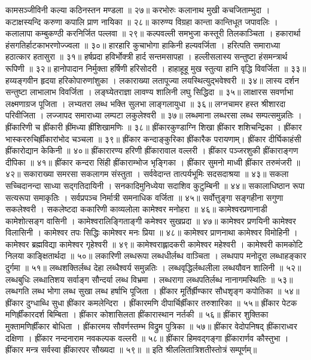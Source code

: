 कामसञ्जीविनी कल्या कठिनस्तन मण्डला ॥ २७॥
करभोरुः कलानाथ मुखी कचजिताम्भुदा ।
कटाक्षस्यन्दि करुणा कपालि प्राण नायिका ॥ २८॥
कारुण्य विग्रहा कान्ता कान्तिधूत जपावलिः ।
कलालापा कम्बुकण्ठी करनिर्जित पल्लवा ॥ २९॥
कल्पवल्ली समभुजा कस्तूरी तिलकाञ्चिता ।
हकारार्था हंसगतिर्हाटकाभरणोज्ज्वला ॥ ३०॥
हारहारि कुचाभोगा हाकिनी हल्यवर्जिता ।
हरित्पति समाराध्या हठात्कार हतासुरा ॥ ३१॥
हर्षप्रदा हविर्भोक्त्री हार्द सन्तमसापहा ।
हल्लीसलास्य सन्तुष्टा हंसमन्त्रार्थ रूपिणी ॥ ३२॥
हानोपादान निर्मुक्ता हर्षिणी हरिसोदरी ।
हाहाहूहू मुख स्तुत्या हानि वृद्धि विवर्जिता ॥ ३३॥
हय्यङ्गवीन हृदया हरिकोपारुणांशुका ।
लकाराख्या लतापूज्या लयस्थित्युद्भवेश्वरी ॥ ३४॥
लास्य दर्शन सन्तुष्टा लाभालाभ विवर्जिता ।
लङ्घ्येतराज्ञा लावण्य शालिनी लघु सिद्धिदा ॥ ३५॥
लाक्षारस सवर्णाभा लक्ष्मणाग्रज पूजिता ।
लभ्यतरा लब्ध भक्ति सुलभा लाङ्गलायुधा ॥ ३६॥
लग्नचामर हस्त श्रीशारदा परिवीजिता ।
लज्जापद समाराध्या लम्पटा लकुलेश्वरी ॥ ३७॥
लब्धमाना लब्धरसा लब्ध सम्पत्समुन्नतिः ।
ह्रींकारिणी च ह्रींकारी ह्रींमध्या ह्रींशिखामणिः ॥ ३८॥
ह्रींकारकुण्डाग्नि शिखा ह्रींकार शशिचन्द्रिका ।
ह्रींकार भास्कररुचिर्ह्रींकारांभोद चञ्चला ॥ ३९॥
ह्रींकार कन्दाङ्कुरिका ह्रींकारैक परायणाम्।
ह्रींकार दीर्घिकाहंसी ह्रींकारोद्यान केकिनी ॥ ४०॥
ह्रींकारारण्य हरिणी ह्रींकारावाल वल्लरी ।
ह्रींकार पञ्जरशुकी ह्रींकाराङ्गण दीपिका ॥ ४१॥
ह्रींकार कन्दरा सिंही ह्रींकाराम्भोज भृङ्गिका ।
ह्रींकार सुमनो माध्वी ह्रींकार तरुमंजरी ॥ ४२॥
सकाराख्या समरसा सकलागम संस्तुता ।
सर्ववेदान्त तात्पर्यभूमिः सदसदाश्रया ॥ ४३॥
सकला सच्चिदानन्दा साध्या सद्गतिदायिनी ।
सनकादिमुनिध्येया सदाशिव कुटुम्बिनी ॥ ४४॥
सकालाधिष्ठान रूपा सत्यरूपा समाकृतिः ।
सर्वप्रपञ्च निर्मात्री समनाधिक वर्जिता ॥ ४५॥
सर्वोत्तुङ्गा सङ्गहीना सगुणा सकलेश्वरी । सकलेष्टदा
ककारिणी काव्यलोला कामेश्वर मनोहरा ॥ ४६॥
कामेश्वरप्रणानाडी कामेशोत्सङ्ग वासिनी ।
कामेश्वरालिङ्गिताङ्गी कमेश्वर सुखप्रदा ॥ ४७॥
कामेश्वर प्रणयिनी कामेश्वर विलासिनी ।
कामेश्वर तपः सिद्धिः कामेश्वर मनः प्रिया ॥ ४८॥
कामेश्वर प्राणनाथा कामेश्वर विमोहिनी ।
कामेश्वर ब्रह्मविद्या कामेश्वर गृहेश्वरी ॥ ४९॥
कामेश्वराह्लादकरी कामेश्वर महेश्वरी ।
कामेश्वरी कामकोटि निलया काङ्क्षितार्थदा ॥ ५०॥
लकारिणी लब्धरूपा लब्धधीर्लब्ध वाञ्चिता ।
लब्धपाप मनोदूरा लब्धाहङ्कार दुर्गमा ॥ ५१॥
लब्धशक्तिर्लब्ध देहा लब्धैश्वर्य समुन्नतिः ।
लब्धवृद्धिर्लब्धलीला लब्धयौवन शालिनी ॥ ५२॥ लब्धबुधिः
लब्धातिशय सर्वाङ्ग सौन्दर्या लब्ध विभ्रमा ।
लब्धरागा लब्धपतिर्लब्ध नानागमस्थितिः ॥ ५३॥ लब्धगति
लब्ध भोगा लब्ध सुखा लब्ध हर्षाभि पूजिता ।
ह्रींकार मूर्तिर्ह्रीण्कार सौधशृङ्ग कपोतिका ॥ ५४॥
ह्रींकार दुग्धाब्धि सुधा ह्रींकार कमलेन्दिरा ।
ह्रींकारमणि दीपार्चिर्ह्रींकार तरुशारिका ॥ ५५॥
ह्रींकार पेटक मणिर्ह्रींकारदर्श बिम्बिता ।
ह्रींकार कोशासिलता ह्रींकारास्थान नर्तकी ॥ ५६॥
ह्रींकार शुक्तिका मुक्तामणिर्ह्रींकार बोधिता ।
ह्रींकारमय सौवर्णस्तम्भ विद्रुम पुत्रिका ॥ ५७॥
ह्रींकार वेदोपनिषद् ह्रींकाराध्वर दक्षिणा ।
ह्रींकार नन्दनाराम नवकल्पक वल्लरी ॥ ५८॥
ह्रींकार हिमवद्गङ्गा ह्रींकारार्णव कौस्तुभा ।
ह्रींकार मन्त्र सर्वस्वा ह्रींकारपर सौख्यदा ॥ ५९॥
॥ इति श्रीललितात्रिशतीस्तोत्रं सम्पूर्णम्॥

